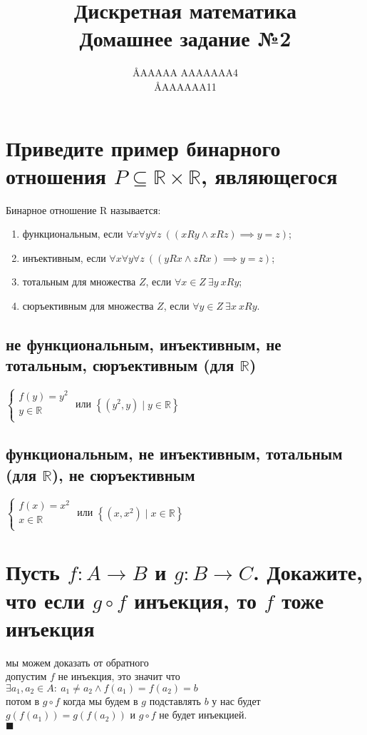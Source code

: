 \documentclass{article}
\title{Дискретная математика \\ Домашнее задание №2}
\author{\AA{AAAAA AAAAAAA}{4} \\ \AA{AAAAAA}{11}}
\newcommand{\R}{\mathbb{R}}
\renewcommand{\l}{\left}
\renewcommand{\r}{\right}
\begin{document}
  \maketitle

  \section{Приведите пример бинарного отношения $P \subseteq \R \times \R$, являющегося}
  Бинарное отношение R называется: %
  \begin{enumerate}
    \item функциональным, если $\forall x\forall y\forall z\ ((xRy \land xRz) \implies y = z)$;
    \item инъективным, если $\forall x\forall y\forall z\ ((yRx \land zRx) \implies y = z)$;
    \item тотальным для множества $Z$, если $\forall x \in Z\ \exists y\ xRy$;
    \item сюръективным для множества $Z$, если $\forall y \in Z\ \exists x\ xRy$.
  \end{enumerate}
  \subsection{не функциональным, инъективным, не тотальным, сюръективным (для $\R$)}
  $\begin{cases}
    f(y) = y^2 \\
    y \in \R \\
  \end{cases}$ или $ \l\{(y^2, y) \mid y \in \R\r\}$
  \subsection{функциональным, не инъективным, тотальным (для $\R$), не сюръективным}
  $\begin{cases}
    f(x) = x^2 \\
    x \in \R \\
  \end{cases}$ или $ \l\{(x, x^2) \mid x \in \R\r\}$

  \section{Пусть $f : A \to B$ и $g : B \to C$. Докажите, что если $g \circ f$ инъекция, то $f$ тоже инъекция}
  мы можем доказать от обратного \\
  допустим $f$ не инъекция, это значит что $\exists a_1,a_2\in A:\ a_1\neq a_2 \land f(a_1)=f(a_2)=b $ \\
  потом в $g \circ f$ когда мы будем в $g$ подставлять $b$ у нас будет $g\l(f\l(a_1\r)\r) = g\l(f\l(a_2\r)\r)$
  и $g \circ f$ не будет инъекцией. \\
  $\blacksquare$
\end{document}
